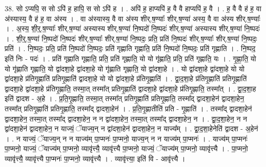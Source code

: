 \documentclass[17pt]{extarticle}
\begin{document}
38. सो ऽप्यपि॒ स सो ऽपि॑ ह॒ हापि॒ स सो ऽपि॑ ह । . अपि॑ ह॒ हाप्यपि॑ ह॒ वै वै हाप्यपि॑ ह॒ वै । . ह॒ वै वै ह॑ ह॒ वा अ॑स्यास्य॒ वै ह॑ ह॒ वा अ॑स्य । . वा अ॑स्यास्य॒ वै वा अ॑स्य शीर्.ष॒ण्याः᳚ शीर्.ष॒ण्या॑ अस्य॒ वै वा अ॑स्य शीर्.ष॒ण्याः᳚ । . अ॒स्य॒ शी॒र्॒.ष॒ण्याः᳚ शीर्.ष॒ण्या॑ अस्यास्य शीर्.ष॒ण्या॑ नि॒ष्पदो॑ नि॒ष्पदः॑ शीर्.ष॒ण्या॑ अस्यास्य शीर्.ष॒ण्या॑ नि॒ष्पदः॑ । . शी॒र्॒.ष॒ण्या॑ नि॒ष्पदो॑ नि॒ष्पदः॑ शीर्.ष॒ण्याः᳚ शीर्.ष॒ण्या॑ नि॒ष्पदः॒ प्रति॒ प्रति॑ नि॒ष्पदः॑ शीर्.ष॒ण्याः᳚ शीर्.ष॒ण्या॑ नि॒ष्पदः॒ प्रति॑ । . नि॒ष्पदः॒ प्रति॒ प्रति॑ नि॒ष्पदो॑ नि॒ष्पदः॒ प्रति॑ गृह्णाति गृह्णाति॒ प्रति॑ नि॒ष्पदो॑ नि॒ष्पदः॒ प्रति॑ गृह्णाति । . नि॒ष्पद॒ इति॑ निः - पदः॑ । . प्रति॑ गृह्णाति गृह्णाति॒ प्रति॒ प्रति॑ गृह्णाति॒ यो यो गृ॑ह्णाति॒ प्रति॒ प्रति॑ गृह्णाति॒ यः । . गृ॒ह्णा॒ति॒ यो यो गृ॑ह्णाति गृह्णाति॒ यो द्वा॑दशा॒हे द्वा॑दशा॒हे यो गृ॑ह्णाति गृह्णाति॒ यो द्वा॑दशा॒हे । . यो द्वा॑दशा॒हे द्वा॑दशा॒हे यो यो द्वा॑दशा॒हे प्र॑तिगृ॒ह्णाति॑ प्रतिगृ॒ह्णाति॑ द्वादशा॒हे यो यो द्वा॑दशा॒हे प्र॑तिगृ॒ह्णाति॑ । . द्वा॒द॒शा॒हे प्र॑तिगृ॒ह्णाति॑ प्रतिगृ॒ह्णाति॑ द्वादशा॒हे द्वा॑दशा॒हे प्र॑तिगृ॒ह्णाति॒ तस्मा॒त् तस्मा᳚त् प्रतिगृ॒ह्णाति॑ द्वादशा॒हे द्वा॑दशा॒हे प्र॑तिगृ॒ह्णाति॒ तस्मा᳚त् । . द्वा॒द॒शा॒ह इति॑ द्वादश - अ॒हे । . प्र॒ति॒गृ॒ह्णाति॒ तस्मा॒त् तस्मा᳚त् प्रतिगृ॒ह्णाति॑ प्रतिगृ॒ह्णाति॒ तस्मा᳚द् द्वादशा॒हेन॑ द्वादशा॒हेन॒ तस्मा᳚त् प्रतिगृ॒ह्णाति॑ प्रतिगृ॒ह्णाति॒ तस्मा᳚द् द्वादशा॒हेन॑ । . प्र॒ति॒गृ॒ह्णातीति॑ प्रति - गृ॒ह्णाति॑ । . तस्मा᳚द् द्वादशा॒हेन॑ द्वादशा॒हेन॒ तस्मा॒त् तस्मा᳚द् द्वादशा॒हेन॒ न न द्वा॑दशा॒हेन॒ तस्मा॒त् तस्मा᳚द् द्वादशा॒हेन॒ न । . द्वा॒द॒शा॒हेन॒ न न द्वा॑दशा॒हेन॑ द्वादशा॒हेन॒ न याज्यं॒ ॅयाज्य॒न् न द्वा॑दशा॒हेन॑ द्वादशा॒हेन॒ न याज्य᳚म् । . द्वा॒द॒शा॒हेनेति॑ द्वादश - अ॒हेन॑ । . न याज्यं॒ ॅयाज्य॒न् न न याज्य॑म् पा॒प्मनः॑ पा॒प्मनो॒ याज्य॒न् न न याज्य॑म् पा॒प्मनः॑ । . याज्य॑म् पा॒प्मनः॑ पा॒प्मनो॒ याज्यं॒ ॅयाज्य॑म् पा॒प्मनो॒ व्यावृ॑त्त्यै॒ व्यावृ॑त्त्यै पा॒प्मनो॒ याज्यं॒ ॅयाज्य॑म् पा॒प्मनो॒ व्यावृ॑त्त्यै । . पा॒प्मनो॒ व्यावृ॑त्त्यै॒ व्यावृ॑त्त्यै पा॒प्मनः॑ पा॒प्मनो॒ व्यावृ॑त्त्यै । . व्यावृ॑त्त्या॒ इति॑ वि - आवृ॑त्त्यै । \newline
\pagebreak
{}
\end{document}
